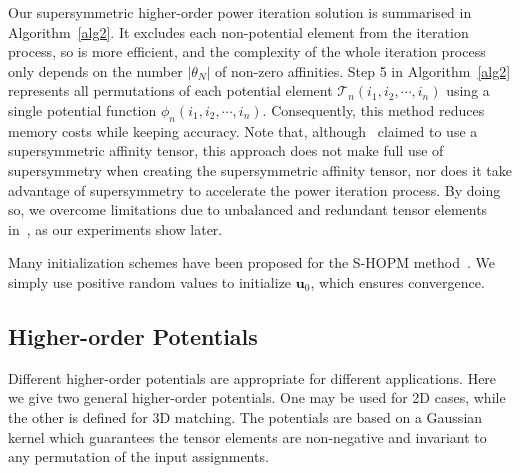 Our supersymmetric higher-order power iteration solution is summarised in Algorithm~\ref{alg2}. It excludes each non-potential element from the iteration process, so is more efficient,
and the complexity of the whole iteration process only depends on the number $|\theta_N|$ of non-zero affinities. Step 5 in Algorithm~\ref{alg2} represents all permutations of each potential element $\mathcal{T}_n(i_1,i_2,\cdots,i_n)$
using a single potential function $\phi_n(i_1,i_2,\cdots,i_n)$.
Consequently, this method reduces memory costs while keeping accuracy.
Note that, although~\cite{Duchenne09}  claimed to use a supersymmetric affinity tensor,
this approach does not make full use of supersymmetry when creating the supersymmetric affinity tensor,
nor does it  take advantage of supersymmetry to accelerate the power iteration process.
By doing so, we overcome limitations due to unbalanced and redundant tensor elements in~\cite{Duchenne09}, as our experiments show later.

Many initialization schemes have been proposed for the S-HOPM method~\cite{Kofidis02}.
We simply use positive random values to initialize $\boldsymbol{u}_0$, which ensures   convergence.

\subsection{Higher-order Potentials}
\label{subsec:potentials}

Different higher-order potentials are appropriate for different applications.
Here we give two general higher-order potentials.
One may be used for  2D cases, while the other is defined for 3D matching.
The potentials are based on a Gaussian kernel
which guarantees the tensor elements are non-negative and invariant to any permutation of the input assignments.

